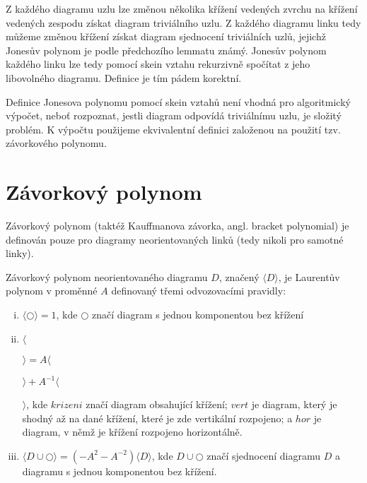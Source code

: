 \begin{pozn}
Z každého diagramu uzlu lze změnou několika křížení vedených zvrchu na křížení vedených zespodu získat diagram triviálního uzlu. Z každého diagramu linku tedy můžeme změnou křížení získat diagram sjednocení triviálních uzlů, jejichž Jonesův polynom je podle předchozího lemmatu známý. Jonesův polynom každého linku lze tedy pomocí skein vztahu rekurzivně spočítat z jeho libovolného diagramu. Definice je tím pádem korektní.
\end{pozn}


Definice Jonesova polynomu pomocí skein vztahů není vhodná pro algoritmický výpočet, neboť rozpoznat, jestli diagram odpovídá triviálnímu uzlu, je složitý problém. K výpočtu použijeme ekvivalentní definici založenou na použití tzv. závorkového polynomu.

\section{Závorkový polynom}
Závorkový polynom (taktéž Kauffmanova závorka, angl. bracket polynomial) je definován pouze pro diagramy neorientovaných linků (tedy nikoli pro samotné linky). 

\begin{definice}\label{def01:2}
Závorkový polynom neorientovaného diagramu $D$, značený $\langle D \rangle$, je Laurentův polynom v proměnné $A$ definovaný třemi odvozovacími pravidly:
\begin{enumerate}[i.]
\item
$ \langle \bigcirc  \rangle = 1$, kde $\bigcirc$ značí diagram s jednou komponentou bez křížení
\item
$ \langle$ 
$\rangle = A  \langle $
$ \rangle + A^{-1}  \langle $
$\rangle $, kde $krizeni$ značí diagram obsahující křížení; $vert$ je diagram, který je shodný až na dané křížení, které je zde vertikální rozpojeno; a $hor$ je diagram, v němž je křížení rozpojeno horizontálně.
\item
$ \langle D \cup \bigcirc \rangle = (-A^2 - A^{-2}) \langle D \rangle$, kde $D \cup \bigcirc $ značí sjednocení diagramu $D$ a diagramu s jednou komponentou bez křížení.
\end{enumerate}


\end{definice}

